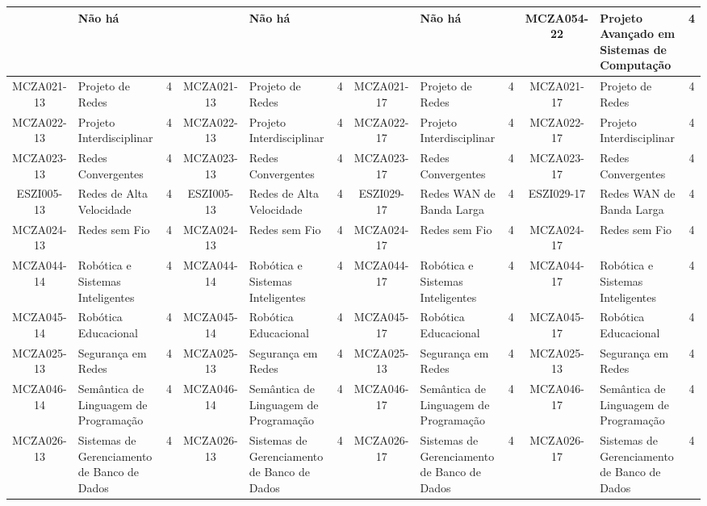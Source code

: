 \documentclass[a4paper]{article}
\begin{document}
\begin{landscape}
{\begin{longtable}{|c|p{.2\textheight}|c||c|p{.2\textheight}|c||c|p{.2\textheight}|c||c|p{.2\textheight}|c|}
& Não há & &
& Não há & & 
& Não há & & 
MCZA054-22 & Projeto Avançado em Sistemas de Computação & 4\\ \hline

MCZA021-13 & Projeto de Redes & 4 &
MCZA021-13 & Projeto de Redes & 4 &
MCZA021-17 & Projeto de Redes & 4 &
MCZA021-17 & Projeto de Redes & 4\\ \hline

MCZA022-13 & Projeto Interdisciplinar & 4 &
MCZA022-13 & Projeto Interdisciplinar & 4 &
MCZA022-17 & Projeto Interdisciplinar & 4 & 
MCZA022-17 & Projeto Interdisciplinar & 4\\ \hline

MCZA023-13 & Redes Convergentes & 4 &
MCZA023-13 & Redes Convergentes & 4 &
MCZA023-17 & Redes Convergentes & 4 &
MCZA023-17 & Redes Convergentes & 4\\ \hline

ESZI005-13 & Redes de Alta Velocidade & 4 &
ESZI005-13 & Redes de Alta Velocidade & 4 &
ESZI029-17 & Redes WAN de Banda Larga & 4 &
ESZI029-17 & Redes WAN de Banda Larga & 4\\ \hline

MCZA024-13 & Redes sem Fio & 4 &
MCZA024-13 & Redes sem Fio & 4 &
MCZA024-17 & Redes sem Fio & 4 &
MCZA024-17 & Redes sem Fio & 4\\ \hline

MCZA044-14 & Robótica e Sistemas Inteligentes & 4 &
MCZA044-14 & Robótica e Sistemas Inteligentes & 4 &
MCZA044-17 & Robótica e Sistemas Inteligentes & 4 &
MCZA044-17 & Robótica e Sistemas Inteligentes & 4\\ \hline

MCZA045-14 & Robótica Educacional & 4 &
MCZA045-14 & Robótica Educacional & 4 &
MCZA045-17 & Robótica Educacional & 4 &
MCZA045-17 & Robótica Educacional & 4\\ \hline

MCZA025-13 & Segurança em Redes & 4 &
MCZA025-13 & Segurança em Redes & 4 &
MCZA025-13 & Segurança em Redes & 4 & 
MCZA025-13 & Segurança em Redes & 4\\ \hline

MCZA046-14 & Semântica de Linguagem de Programação & 4 &
MCZA046-14 & Semântica de Linguagem de Programação & 4 &
MCZA046-17 & Semântica de Linguagem de Programação & 4 &
MCZA046-17 & Semântica de Linguagem de Programação & 4\\ \hline

MCZA026-13 & Sistemas de Gerenciamento de Banco de Dados & 4 &
MCZA026-13 & Sistemas de Gerenciamento de Banco de Dados & 4 &
MCZA026-17 & Sistemas de Gerenciamento de Banco de Dados & 4 & 
MCZA026-17 & Sistemas de Gerenciamento de Banco de Dados & 4\\ \hline


\end{longtable}}
\end{landscape}
\end{document}

